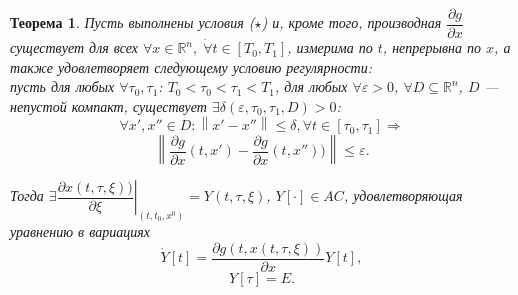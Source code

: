 \documentclass[12pt, a4paper]{article}
\theoremstyle{rusdef}
\newtheorem{theorem}{Теорема}
\newcommand{\R}{\ensuremath{\mathbb{R}}} %
\renewcommand{\d}{\partial} %
\newcommand{\norm}[1]{\left\lVert #1 \right\rVert} %
\DeclareMathOperator*{\thus}{\Rightarrow} %
\begin{document}
\begin{theorem}
Пусть выполнены условия ($\star$) и, кроме того, производная $\dfrac{\d g}{\d x}$ существует для всех $\forall x \in \R^n, \; \dot{\forall} t \in [T_0, T_1]$, измерима по $t$, непрерывна по $x$, а также удовлетворяет следующему условию регулярности:\\
пусть для любых $\forall \tau_0, \tau_1$: $T_0 < \tau_0 < \tau_1 < T_1$, для любых $\forall \varepsilon >0$, $\forall D \subseteq \R^n$, $D$ --- непустой компакт, существует $\exists \delta(\varepsilon, \tau_0, \tau_1, D) > 0$:
$$
\forall x', x'' \in D \colon \norm{x' - x''} \leqslant \delta, \forall t \in [\tau_0, \tau_1] \thus
$$
$$
\norm{\dfrac{\d g}{\d x}(t, x') - \frac{\d g}{\d x}(t, x''))} \leqslant \varepsilon.
$$

Тогда $\exists \left. \dfrac{\d x(t, \tau, \xi))}{\d \xi} \right|_{(t, t_0, x^0)} = Y(t, \tau, \xi)$, $Y[\cdot] \in AC$, 
удовлетворяющая уравнению в вариациях
\begin{equation}\label{eq:variation_eq}
\dot{Y}[t] = \dfrac{\d g(t, x(t, \tau, \xi))}{\d x} Y[t],
\tag{УВ}
\end{equation}
$$
Y[\tau] = E.
$$
\end{theorem}
\end{document}
